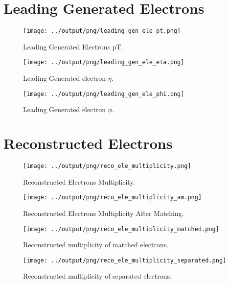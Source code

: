 \documentclass[11pt]{book}
\begin{document}
\section{Leading Generated Electrons}
\begin{figure}[htb]
\centering
\texttt{[image: ../output/png/leading\_gen\_ele\_pt.png]}
\caption{Leading Generated Electrons pT.}
\label{fig:leading_gen_ele_pt}
\end{figure}

\begin{figure}[htb]
\centering
\texttt{[image: ../output/png/leading\_gen\_ele\_eta.png]}
\caption{Leading Generated electron $\eta$.}
\label{fig:leading_gen_ele_eta}
\end{figure}

\begin{figure}[htb]
\centering
\texttt{[image: ../output/png/leading\_gen\_ele\_phi.png]}
\caption{Leading Generated electron $\phi$.}
\label{fig:leading_gen_ele_phi}
\end{figure}
\clearpage

\section{Reconstructed Electrons}

\begin{figure}[htb]
\centering
\texttt{[image: ../output/png/reco\_ele\_multiplicity.png]}
\caption{Reconstructed Electrons Multiplicity.}
\label{fig:reco_ele_multiplicity}
\end{figure}

\begin{figure}[htb]
\centering
\texttt{[image: ../output/png/reco\_ele\_multiplicity\_am.png]}
\caption{Reconstructed Electrons Multiplicity After Matching.}
\label{fig:reco_ele_multiplicity_am}
\end{figure}

\begin{figure}[htb]
\centering
\texttt{[image: ../output/png/reco\_ele\_multiplicity\_matched.png]}
\caption{Reconstructed multiplicity of matched electrons.}
\label{fig:reco_ele_mat}
\end{figure}

\begin{figure}[htb]
\centering
\texttt{[image: ../output/png/reco\_ele\_multiplicity\_separated.png]}
\caption{Reconstructed multiplicity of separated electrons.}
\label{fig:reco_ele_sep}
\end{figure}
\end{document}
